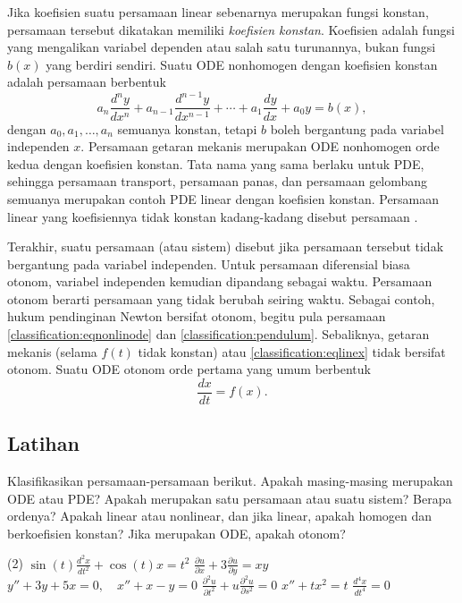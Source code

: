 \medskip

Jika koefisien suatu persamaan linear sebenarnya merupakan fungsi konstan,
persamaan tersebut dikatakan memiliki
\emph{koefisien konstan}.
Koefisien adalah fungsi yang mengalikan variabel dependen atau salah satu
turunannya, bukan fungsi $b(x)$ yang berdiri sendiri.
Suatu ODE nonhomogen dengan koefisien konstan adalah persamaan berbentuk
\begin{equation*}
a_n \frac{d^n y}{dx^n} +
a_{n-1} \frac{d^{n-1} y}{dx^{n-1}} +
\cdots
+
a_{1} \frac{dy}{dx}
+
a_{0} y = b(x) ,
\end{equation*}
dengan $a_0, a_1, \ldots, a_n$ semuanya konstan,
tetapi $b$ boleh bergantung pada variabel independen $x$.
Persamaan getaran mekanis merupakan ODE nonhomogen orde kedua dengan koefisien
konstan\@. Tata nama yang sama berlaku untuk PDE, sehingga persamaan transport,
persamaan panas, dan persamaan gelombang semuanya merupakan contoh PDE linear
dengan koefisien konstan. Persamaan linear yang koefisiennya tidak konstan
kadang-kadang disebut persamaan \emph{}.

\medskip

Terakhir, suatu persamaan (atau sistem) disebut \emph{}
jika persamaan tersebut tidak bergantung pada variabel independen.
Untuk persamaan diferensial biasa otonom, variabel independen kemudian dipandang
sebagai waktu. Persamaan otonom berarti persamaan yang tidak berubah seiring waktu.
Sebagai contoh, hukum pendinginan Newton bersifat otonom, begitu pula persamaan
\eqref{classification:eqnonlinode} dan
\eqref{classification:pendulum}. Sebaliknya, getaran mekanis (selama $f(t)$
tidak konstan) atau \eqref{classification:eqlinex} tidak bersifat otonom.
Suatu ODE otonom orde pertama yang umum berbentuk
\begin{equation*}
\frac{dx}{dt} = f(x) .
\end{equation*}

\pagebreak[3]
\subsection{Latihan}

\begin{exercise}
Klasifikasikan persamaan-persamaan berikut. Apakah masing-masing merupakan ODE
atau PDE? Apakah merupakan satu persamaan atau suatu sistem? Berapa ordenya?
Apakah linear atau nonlinear, dan jika linear, apakah homogen dan berkoefisien
konstan? Jika merupakan ODE\@, apakah otonom?
\begin{tasks}(2)
\task $\displaystyle \sin(t) \frac{d^2 x}{dt^2} + \cos(t) x = t^2$
\task $\displaystyle \frac{\partial u}{\partial x} + 3 \frac{\partial u}{\partial y} = xy$
\task $\displaystyle y''+3y+5x=0, \quad x''+x-y=0$
\task $\displaystyle \frac{\partial^2 u}{\partial t^2} + u\frac{\partial^2 u}{\partial s^2} =
0$
\task $\displaystyle x''+tx^2=t$
\task $\displaystyle \frac{d^4 x}{dt^4} = 0$
\end{tasks}
\end{exercise}

